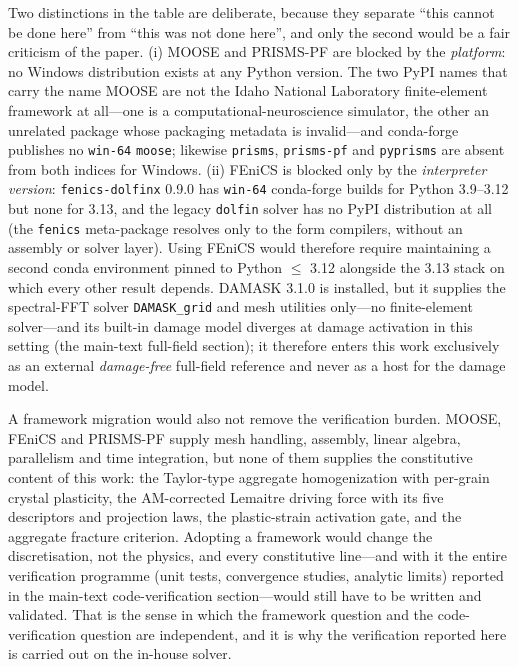 \documentclass[12pt,a4paper,twocolumn]{article}
\begin{document}
Two distinctions in the table are deliberate, because they separate ``this cannot be done here'' from
``this was not done here'', and only the second would be a fair criticism of the paper. (i) MOOSE and
PRISMS-PF are blocked by the \emph{platform}: no Windows distribution exists at any Python version. The
two PyPI names that carry the name MOOSE are not the Idaho National Laboratory finite-element framework
at all---one is a computational-neuroscience simulator, the other an unrelated package whose packaging
metadata is invalid---and conda-forge publishes no \texttt{win-64} \texttt{moose}; likewise
\texttt{prisms}, \texttt{prisms-pf} and \texttt{pyprisms} are absent from both indices for Windows.
(ii) FEniCS is blocked only by the \emph{interpreter version}: \texttt{fenics-dolfinx} 0.9.0 has
\texttt{win-64} conda-forge builds for Python 3.9--3.12 but none for 3.13, and the legacy \texttt{dolfin}
solver has no PyPI distribution at all (the \texttt{fenics} meta-package resolves only to the form
compilers, without an assembly or solver layer). Using FEniCS would therefore require maintaining a
second conda environment pinned to Python $\le$ 3.12 alongside the 3.13 stack on which every other
result depends. DAMASK 3.1.0 is installed, but it supplies the spectral-FFT solver \texttt{DAMASK\_grid}
and mesh utilities only---no finite-element solver---and its built-in damage model diverges at damage
activation in this setting (the main-text full-field section); it therefore enters this work
exclusively as an external \emph{damage-free} full-field reference and never as a host for the damage
model.

A framework migration would also not remove the verification burden. MOOSE, FEniCS and PRISMS-PF supply
mesh handling, assembly, linear algebra, parallelism and time integration, but none of them supplies the
constitutive content of this work: the Taylor-type aggregate homogenization with per-grain crystal
plasticity, the AM-corrected Lemaitre driving force with its five descriptors and projection laws, the
plastic-strain activation gate, and the aggregate fracture criterion. Adopting a framework would change
the discretisation, not the physics, and every constitutive line---and with it the entire verification
programme (unit tests, convergence studies, analytic limits) reported in the main-text code-verification
section---would still have to be written and validated. That is the sense in which the framework question
and the code-verification question are independent, and it is why the verification reported here is
carried out on the in-house solver.
\end{document}
